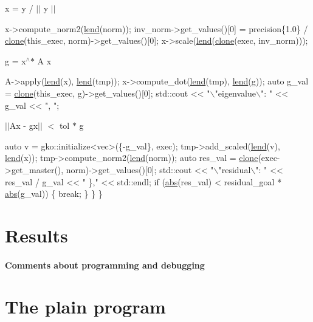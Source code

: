 x = y / $\vert$$\vert$ y $\vert$$\vert$


\begin{DoxyCode}
x->compute\_norm2(\hyperlink{namespacegko_aa8cb4876b72e5e1036ea9575443c439b}{lend}(norm));
inv\_norm->get\_values()[0] =
    precision\{1.0\} / \hyperlink{namespacegko_a1beb80750459e4201aa9d882d2d074c3}{clone}(this\_exec, norm)->get\_values()[0];
x->scale(\hyperlink{namespacegko_aa8cb4876b72e5e1036ea9575443c439b}{lend}(\hyperlink{namespacegko_a1beb80750459e4201aa9d882d2d074c3}{clone}(exec, inv\_norm)));
\end{DoxyCode}


g = x$^\wedge$$\ast$ A x


\begin{DoxyCode}
A->apply(\hyperlink{namespacegko_aa8cb4876b72e5e1036ea9575443c439b}{lend}(x), \hyperlink{namespacegko_aa8cb4876b72e5e1036ea9575443c439b}{lend}(tmp));
x->compute\_dot(\hyperlink{namespacegko_aa8cb4876b72e5e1036ea9575443c439b}{lend}(tmp), \hyperlink{namespacegko_aa8cb4876b72e5e1036ea9575443c439b}{lend}(g));
\textcolor{keyword}{auto} g\_val = \hyperlink{namespacegko_a1beb80750459e4201aa9d882d2d074c3}{clone}(this\_exec, g)->get\_values()[0];
std::cout << \textcolor{stringliteral}{"\(\backslash\)"eigenvalue\(\backslash\)": "} << g\_val << \textcolor{stringliteral}{", "};
\end{DoxyCode}


$\vert$$\vert$\+Ax -\/ gx$\vert$$\vert$ $<$ tol $\ast$ g


\begin{DoxyCode}
        \textcolor{keyword}{auto} v = gko::initialize<vec>(\{-g\_val\}, exec);
        tmp->add\_scaled(\hyperlink{namespacegko_aa8cb4876b72e5e1036ea9575443c439b}{lend}(v), \hyperlink{namespacegko_aa8cb4876b72e5e1036ea9575443c439b}{lend}(x));
        tmp->compute\_norm2(\hyperlink{namespacegko_aa8cb4876b72e5e1036ea9575443c439b}{lend}(norm));
        \textcolor{keyword}{auto} res\_val = \hyperlink{namespacegko_a1beb80750459e4201aa9d882d2d074c3}{clone}(exec->get\_master(), norm)->get\_values()[0];
        std::cout << \textcolor{stringliteral}{"\(\backslash\)"residual\(\backslash\)": "} << res\_val / g\_val << \textcolor{stringliteral}{" \},"} << std::endl;
        \textcolor{keywordflow}{if} (\hyperlink{namespacegko_a57797fc0a00fd4b7ff34ca4bfc84bc51}{abs}(res\_val) < residual\_goal * \hyperlink{namespacegko_a57797fc0a00fd4b7ff34ca4bfc84bc51}{abs}(g\_val)) \{
            \textcolor{keywordflow}{break};
        \}
    \}
\}
\end{DoxyCode}
 \label{_Results}%
\section*{Results}

\label{_Commentsaboutprogramminganddebugging}%
\paragraph*{Comments about programming and debugging }

\label{_PlainProg}%
 \section*{The plain program}


\begin{DoxyCodeInclude}
\end{DoxyCodeInclude}
 